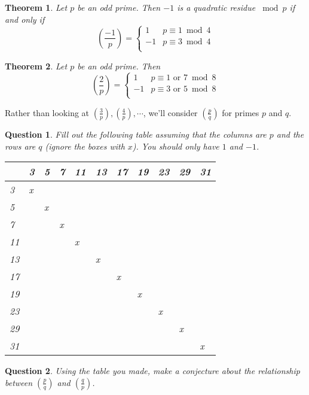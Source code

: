 \documentclass[12pt]{amsart}
\theoremstyle{plain}
\newtheorem{thm}{Theorem}
\newtheorem{quest}{Question}
\theoremstyle{definition}
\theoremstyle{remark}
\begin{document}
\begin{thm}
Let $p$ be an odd prime.  Then $-1$ is a quadratic residue $\bmod p$ if and only if
\[ \left( \frac{-1}{p}\right) = \begin{cases} 
      1 & p \equiv 1 \bmod 4 \\
      -1 & p \equiv 3 \bmod 4 \\
   \end{cases}
\]
\end{thm}

\begin{thm}
Let $p$ be an odd prime.  Then
\[ \left( \frac{2}{p}\right) = \begin{cases} 
      1 & p \equiv 1 \text{ or } 7 \bmod 8\\
      -1 & p \equiv 3  \text{ or }  5 \bmod 8\\
   \end{cases}
\]
\end{thm}

Rather than looking at $ \left( \frac{3}{p}\right),  \left( \frac{4}{p}\right), \cdots$, we'll consider $\left( \frac{p}{q}\right)$ for primes $p$ and $q$.

\newpage \begin{quest} 
Fill out the following table assuming that the columns are $p$ and the rows are $q$ (ignore the boxes with $x$).  You should only have $1$ and $-1$.
\begin{center}
\begin{tabular}{|p{.4in}||p{.4in}|p{.4in}|p{.4in}|p{.4in}|p{.4in}|p{.4in}|p{.4in}|p{.4in}|p{.4in}|p{.4in}|} \hline
&3&5&7&11&13&17&19&23&29&31\\ \hline\hline
3 &x&&&&&&&&&\\[.2in] \hline
5 &&x&&&&&&&&\\[.2in] \hline
7 &&&x&&&&&&&\\[.2in] \hline
11 &&&&x&&&&&&\\[.2in] \hline
13 &&&&&x&&&&&\\[.2in] \hline
17 &&&&&&x&&&&\\[.2in] \hline
19 &&&&&&&x&&&\\[.2in] \hline
23 &&&&&&&&x&&\\[.2in] \hline
29 &&&&&&&&&x&\\[.2in] \hline
31 &&&&&&&&&&x\\[.2in] \hline
\end{tabular}
\end{center}
\end{quest}

\begin{quest} 
Using the table you made, make a conjecture about the relationship between $\left( \frac{p}{q}\right)$ and $\left( \frac{q}{p}\right)$.\\ \vspace{1in}
\end{quest}
\end{document}
